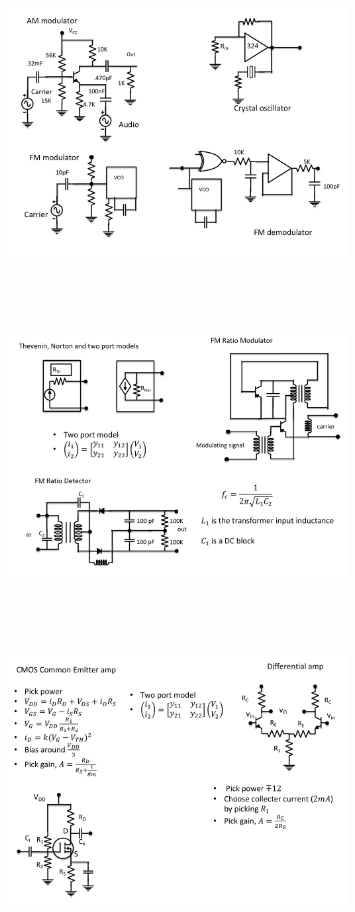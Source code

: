 \begin{figure} 
\center
\includegraphics[width=0.8\textwidth,natwidth=642,natheight=610, height=80mm, width=88mm]{circuit15.pdf}
\end{figure}
\begin{figure} 
\center
\includegraphics[width=0.8\textwidth,natwidth=642,natheight=610, height=80mm, width=88mm]{circuit16.pdf}
\end{figure}
\begin{figure} 
\center
\includegraphics[width=0.8\textwidth,natwidth=642,natheight=610, height=80mm, width=88mm]{circuit17.pdf}
\end{figure}

